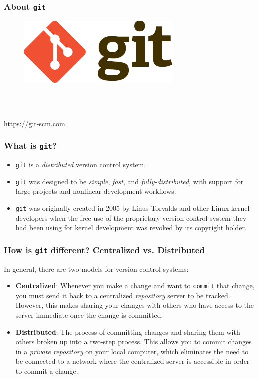 \documentclass{beamer}
\begin{document}
\begin{frame}
   \frametitle{About \texttt{git}}
   \begin{figure}[htbp]
      \includegraphics[width=0.7\textwidth]{images/git-logo.png}
   \end{figure}
   \ \\ \ \\ 
   \begin{center}
      \url{https://git-scm.com}
   \end{center}
\end{frame}

\begin{frame}
   \frametitle{What is \texttt{git}?}
   \begin{itemize}
      \setlength\itemsep{1.0em}
      \item \texttt{git} is a \textit{distributed} version control 
         system.
      \item \texttt{git} was designed to be \textit{simple}, 
         \textit{fast}, and \textit{fully-distributed}, with support for 
         large projects and nonlinear development workflows.
      \item \texttt{git} was originally created in 2005 by Linus 
         Torvalds and other Linux kernel developers when the free use of 
         the proprietary version control system they had been using for 
         kernel development was revoked by its copyright holder.
   \end{itemize}
\end{frame}

\begin{frame}
   \frametitle{How is \texttt{git} different? Centralized vs. Distributed}
   In general, there are two models for version control systems: \\
   \begin{itemize}
      \setlength\itemsep{1.0em}
      \item \textbf{Centralized}: Whenever you make a change and want to 
         \texttt{commit} that change, you must send it back to a 
         centralized \textit{repository} server to be tracked. However, 
         this makes sharing your changes with others who have access to 
         the server immediate once the change is committed. 
      \item \textbf{Distributed}: The process of committing changes and 
         sharing them with others broken up into a two-step process. 
         This allows you to commit changes in a 
         \textit{private repository} on your local computer, which 
         eliminates the need to be connected to a network where the 
         centralized server is accessible in order to commit a change. 
   \end{itemize}
\end{frame}
\end{document}
